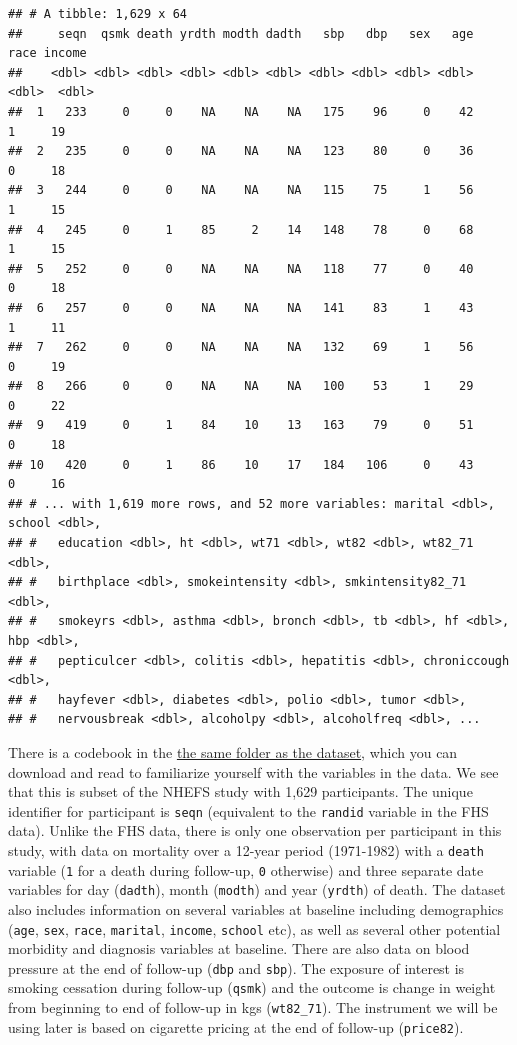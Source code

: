 \documentclass[
]{book}
\begin{document}
\begin{verbatim}
## # A tibble: 1,629 x 64
##     seqn  qsmk death yrdth modth dadth   sbp   dbp   sex   age  race income
##    <dbl> <dbl> <dbl> <dbl> <dbl> <dbl> <dbl> <dbl> <dbl> <dbl> <dbl>  <dbl>
##  1   233     0     0    NA    NA    NA   175    96     0    42     1     19
##  2   235     0     0    NA    NA    NA   123    80     0    36     0     18
##  3   244     0     0    NA    NA    NA   115    75     1    56     1     15
##  4   245     0     1    85     2    14   148    78     0    68     1     15
##  5   252     0     0    NA    NA    NA   118    77     0    40     0     18
##  6   257     0     0    NA    NA    NA   141    83     1    43     1     11
##  7   262     0     0    NA    NA    NA   132    69     1    56     0     19
##  8   266     0     0    NA    NA    NA   100    53     1    29     0     22
##  9   419     0     1    84    10    13   163    79     0    51     0     18
## 10   420     0     1    86    10    17   184   106     0    43     0     16
## # ... with 1,619 more rows, and 52 more variables: marital <dbl>, school <dbl>,
## #   education <dbl>, ht <dbl>, wt71 <dbl>, wt82 <dbl>, wt82_71 <dbl>,
## #   birthplace <dbl>, smokeintensity <dbl>, smkintensity82_71 <dbl>,
## #   smokeyrs <dbl>, asthma <dbl>, bronch <dbl>, tb <dbl>, hf <dbl>, hbp <dbl>,
## #   pepticulcer <dbl>, colitis <dbl>, hepatitis <dbl>, chroniccough <dbl>,
## #   hayfever <dbl>, diabetes <dbl>, polio <dbl>, tumor <dbl>,
## #   nervousbreak <dbl>, alcoholpy <dbl>, alcoholfreq <dbl>, ...
\end{verbatim}

There is a codebook in the \href{https://github.com/geanders/adv_epi_analysis/tree/master/data}{the same folder as the dataset}, which you can download and read to familiarize yourself with the variables in the data.
We see that this is subset of the NHEFS study with 1,629 participants. The unique identifier for participant is \texttt{seqn} (equivalent to the \texttt{randid} variable in the FHS data). Unlike the FHS data, there is only one observation per participant in this study, with data on mortality over a 12-year period (1971-1982) with a \texttt{death} variable (\texttt{1} for a death during follow-up, \texttt{0} otherwise) and three separate date variables for day (\texttt{dadth}), month (\texttt{modth}) and year (\texttt{yrdth}) of death. The dataset also includes information on several variables at baseline including demographics (\texttt{age}, \texttt{sex}, \texttt{race}, \texttt{marital}, \texttt{income}, \texttt{school} etc), as well as several other potential morbidity and diagnosis variables at baseline. There are also data on blood pressure at the end of follow-up (\texttt{dbp} and \texttt{sbp}). The exposure of interest is smoking cessation during follow-up (\texttt{qsmk}) and the outcome is change in weight from beginning to end of follow-up in kgs (\texttt{wt82\_71}). The instrument we will be using later is based on cigarette pricing at the end of follow-up (\texttt{price82}).
\end{document}
